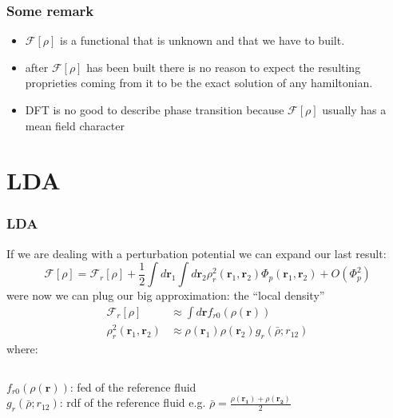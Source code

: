 \documentclass[12pt,notes=off,unicode]{beamer}
\begin{document}
  \begin{frame}[c]\frametitle{Some remark}
      \begin{itemize}
        \item $\mathcal{F}[\rho]$ is a functional that is unknown and that we have to built.
        \item after $\mathcal{F}[\rho]$ has been built there is no reason to expect the resulting proprieties coming from it to be the exact solution of any hamiltonian.
        \item DFT is no good to describe phase transition because $\mathcal{F}[\rho]$ usually has a mean field character
      \end{itemize}
  \end{frame} 

  \section{LDA} %
  \label{sec:lda}
  \begin{frame}[c]\frametitle{LDA}
  If we are dealing with a perturbation potential we can expand our last result:
  \begin{equation}
    \mathcal{F}[\rho] = \mathcal{F}_r[\rho]+\frac{1}{2} \int d \mathbf{r}_1 \int d\mathbf{r}_2 \rho^2_r(\mathbf{r}_1, \mathbf{r}_2) \Phi_p(\mathbf{r}_1,\mathbf{r}_2)+ O(\Phi_p^2)
  \end{equation}
  were now we can plug our big approximation: the ``local density''
  \begin{align*} 
    \mathcal{F}_r[\rho] & \approx \int d \mathbf{r} f_{r0}(\rho(\mathbf{r})) \\
     \rho^2_r(\mathbf{r}_1, \mathbf{r}_2) & \approx \rho(\mathbf{r}_1) \rho(\mathbf{r}_2) g_r(\bar{\rho}; r_{12})
  \end{align*} 
  where:
  \begin{columns}
    $f_{r0}(\rho(\mathbf{r}))$: fed of the reference fluid\\
    $g_r(\bar{\rho}; r_{12})$: rdf of the reference fluid
    e.g. $\bar{\rho}=\frac{\rho(\mathbf{r_1})+\rho(\mathbf{r_2})}{2}$
  \end{columns}
  \end{frame}
  
\end{document}
